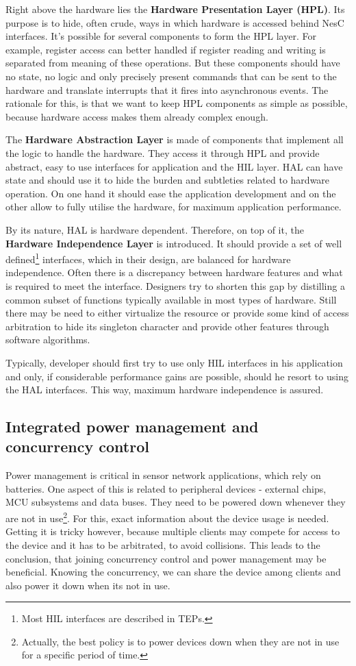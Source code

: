 Right above the hardware lies the {\bf Hardware Presentation Layer
(HPL)}. Its purpose is to hide, often crude, ways in which hardware is
accessed behind NesC interfaces. It's possible for several
components to form the HPL layer. For example, register access can
better handled if register reading and writing is separated from
meaning of these operations. But these components should have no
state, no logic and only precisely present commands that can be sent
to the hardware and translate interrupts that it fires into
asynchronous events. The rationale for this, is that we want to keep
HPL components as simple as possible, because hardware access makes
them already complex enough.

The {\bf Hardware Abstraction Layer} is made of components that
implement all the logic to handle the hardware. They access it through
HPL and provide abstract, easy to use interfaces for application and
the HIL layer. HAL can have state and should use it to hide the burden
and subtleties related to hardware operation. On one hand it should
ease the application development and on the other allow to fully
utilise the hardware, for maximum application performance.

By its nature, HAL is hardware dependent. Therefore, on top of it,
the {\bf Hardware Independence Layer} is introduced. It should provide
a set of well defined\footnote{Most HIL interfaces are described in
TEPs.} interfaces, which in their design, are balanced for hardware
independence. Often there is a discrepancy between hardware features
and what is required to meet the interface.  Designers try to shorten
this gap by distilling a common subset of functions typically
available in most types of hardware. Still there may be need to either
virtualize the resource or provide some kind of access arbitration to
hide its singleton character and provide other features through
software algorithms.

Typically, developer should first try to use only HIL interfaces in
his application and only, if considerable performance gains are possible,
should he resort to using the HAL interfaces. This way, maximum
hardware independence is assured.

\subsection{Integrated power management and concurrency control}
\label{ch:concurrency_and_power}

Power management is critical in sensor network applications, which
rely on batteries. One aspect of this is related to peripheral devices
- external chips, MCU subsystems and data buses. They need to be
powered down whenever they are not in use\footnote{Actually, the best
policy is to power devices down when they are not in use for a specific
period of time.}. For this, exact information about the device usage
is needed.  Getting it is tricky however, because multiple clients may
compete for access to the device and it has to be arbitrated, to avoid
collisions.  This leads to the conclusion, that joining concurrency
control and power management may be beneficial. Knowing the
concurrency, we can share the device among clients and also power it
down when its not in use.

